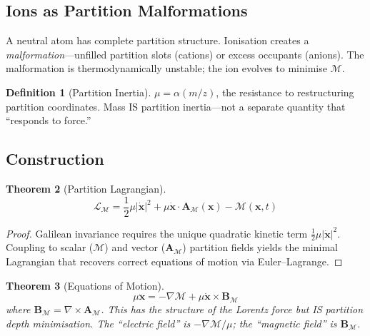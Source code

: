 \documentclass[11pt,twocolumn,a4paper]{article}
\newtheorem{theorem}{Theorem}[section]
\theoremstyle{definition}
\newtheorem{definition}[theorem]{Definition}
\theoremstyle{remark}
\newcommand{\Depth}{\mathcal{M}}
\newcommand{\partinert}{\mu}
\newcommand{\Apartition}{\mathbf{A}_{\mathcal{M}}}
\newcommand{\Lagr}{\mathcal{L}}
\begin{document}
\subsection{Ions as Partition Malformations}

A neutral atom has complete partition structure. Ionisation creates a \emph{malformation}---unfilled partition slots (cations) or excess occupants (anions). The malformation is thermodynamically unstable; the ion evolves to minimise $\Depth$.

\begin{definition}[Partition Inertia]
$\partinert = \alpha(m/z)$, the resistance to restructuring partition coordinates. Mass IS partition inertia---not a separate quantity that ``responds to force.''
\end{definition}

\subsection{Construction}

\begin{theorem}[Partition Lagrangian]
\label{thm:lagrangian}
\begin{equation}
\boxed{\Lagr_\Depth = \frac{1}{2}\partinert|\dot{\mathbf{x}}|^2 + \partinert\dot{\mathbf{x}}\cdot\Apartition(\mathbf{x}) - \Depth(\mathbf{x}, t)}
\end{equation}
\end{theorem}

\begin{proof}
Galilean invariance requires the unique quadratic kinetic term $\frac{1}{2}\partinert|\dot{\mathbf{x}}|^2$. Coupling to scalar ($\Depth$) and vector ($\Apartition$) partition fields yields the minimal Lagrangian that recovers correct equations of motion via Euler--Lagrange.
\end{proof}

\begin{theorem}[Equations of Motion]
\begin{equation}
\boxed{\partinert\ddot{\mathbf{x}} = -\nabla\Depth + \partinert\dot{\mathbf{x}} \times \mathbf{B}_\Depth}
\end{equation}
where $\mathbf{B}_\Depth = \nabla \times \Apartition$. This has the \emph{structure} of the Lorentz force but IS partition depth minimisation. The ``electric field'' is $-\nabla\Depth/\partinert$; the ``magnetic field'' is $\mathbf{B}_\Depth$.
\end{theorem}
\end{document}
